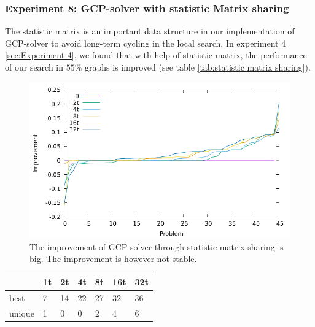 \documentclass[12pt,a4paper,twoside]{scrartcl}
\numberwithin{equation}{section}
\begin{document}
\subsubsection{Experiment 8: GCP-solver with statistic Matrix sharing}
\label{sec:Experiment 8}
The statistic matrix is an important data structure in our implementation of GCP-solver to avoid long-term cycling in the local search. In experiment 4 \ref{sec:Experiment 4}, we found that with help of statistic matrix, the performance of our search in $55\%$ graphs is improved (see table \ref{tab:statistic matrix sharing}).
\begin{figure}[H]
  \includegraphics[scale = 1]{Experiments/E8/imp/impro.pdf}
  \caption{The improvement of GCP-solver through statistic matrix sharing is big. The improvement is however not stable.}
\end{figure}
\begin{table}[h!]
    \begin{tabular}{| l |l| l | l|l|l|p{1cm}|}
\hline
&1t&2t&4t&8t&16t&32t\\ \hline
best& 7&14&22&27&32&36\\ \hline
unique&1&0&0&2&4&6\\ \hline
    \end{tabular}
\end{table}
\end{document}

